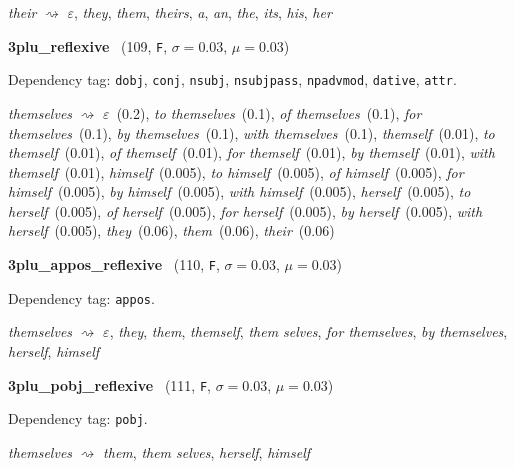 \documentclass[11pt]{article}
\newenvironment{desc}{%
	\list{}{%
		\parsep 0.25em
		\topsep 0.25em
		\leftmargin 1em
		\rightmargin 0em
	}
	\item\relax
	\sloppy
}{%
	\endlist
}
\newcommand{\attr}[4]{%
	(#1, \texttt{#2}, $\sigma=#3$, $\mu=#4$)
}
\begin{document}
\begin{desc}
	\textit{their}
	$\rightsquigarrow$
	\textit{$\varepsilon$},
	\textit{they},
	\textit{them},
	\textit{theirs},
	\textit{a},
	\textit{an},
	\textit{the},
	\textit{its},
	\textit{his},
	\textit{her}
\end{desc}

\noindent
\textbf{3plu\_reflexive}~\attr{109}{F}{0.03}{0.03}

\begin{desc}
	Dependency tag:
	\texttt{dobj},
	\texttt{conj},
	\texttt{nsubj},
	\texttt{nsubjpass},
	\texttt{npadvmod},
	\texttt{dative},
	\texttt{attr}.

	\textit{themselves}
	$\rightsquigarrow$
	\textit{$\varepsilon$}~(0.2),
	\textit{to themselves}~(0.1),
	\textit{of themselves}~(0.1),
	\textit{for themselves}~(0.1),
	\textit{by themselves}~(0.1),
	\textit{with themselves}~(0.1),
	\textit{themself}~(0.01),
	\textit{to themself}~(0.01),
	\textit{of themself}~(0.01),
	\textit{for themself}~(0.01),
	\textit{by themself}~(0.01),
	\textit{with themself}~(0.01),
	\textit{himself}~(0.005),
	\textit{to himself}~(0.005),
	\textit{of himself}~(0.005),
	\textit{for himself}~(0.005),
	\textit{by himself}~(0.005),
	\textit{with himself}~(0.005),
	\textit{herself}~(0.005),
	\textit{to herself}~(0.005),
	\textit{of herself}~(0.005),
	\textit{for herself}~(0.005),
	\textit{by herself}~(0.005),
	\textit{with herself}~(0.005),
	\textit{they}~(0.06),
	\textit{them}~(0.06),
	\textit{their}~(0.06)
\end{desc}

\noindent
\textbf{3plu\_appos\_reflexive}~\attr{110}{F}{0.03}{0.03}

\begin{desc}
	Dependency tag: \texttt{appos}.

	\textit{themselves}
	$\rightsquigarrow$
	\textit{$\varepsilon$},
	\textit{they},
	\textit{them},
	\textit{themself},
	\textit{them selves},
	\textit{for themselves},
	\textit{by themselves},
	\textit{herself},
	\textit{himself}
\end{desc}

\noindent
\textbf{3plu\_pobj\_reflexive}~\attr{111}{F}{0.03}{0.03}

\begin{desc}
	Dependency tag: \texttt{pobj}.

	\textit{themselves}
	$\rightsquigarrow$
	\textit{them},
	\textit{them selves},
	\textit{herself},
	\textit{himself}
\end{desc}
\end{document}
